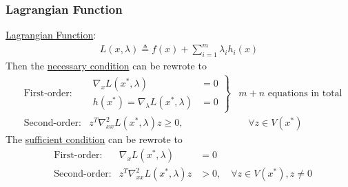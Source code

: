 \documentclass[11pt,a4paper]{article}
\begin{document}
\subsubsection{Lagrangian Function}
\underline{Lagrangian Function}:
\begin{equation}
    \begin{aligned}
        L(x,\lambda)\triangleq f(x)+\sum_{i=1}^m\lambda_i h_i(x)
    \end{aligned}
    \nonumber
\end{equation}
Then the \underline{necessary condition} can be rewrote to
\begin{equation}
    \begin{aligned}
        &\text{First-order:} &
        \left.\begin{matrix}
            \nabla_x L(x^*,\lambda)&=0\\
            h(x^*)=\nabla_\lambda L(x^*,\lambda)&=0
        \end{matrix}\right\}&m+n\text{ equations in total}\\
        &\text{Second-order:} &z^T \nabla_{xx}^2L(x^*,\lambda)z\geq 0,&\quad\forall z\in V(x^*)
    \end{aligned}
    \nonumber
\end{equation}
The \underline{sufficient condition} can be rewrote to
\begin{equation}
    \begin{aligned}
        &\text{First-order:} &
        \nabla_x L(x^*,\lambda)&=0\\
        &\text{Second-order:} &z^T \nabla_{xx}^2L(x^*,\lambda)z&> 0,\quad\forall z\in V(x^*),z\neq 0
    \end{aligned}
    \nonumber
\end{equation}
\end{document}
